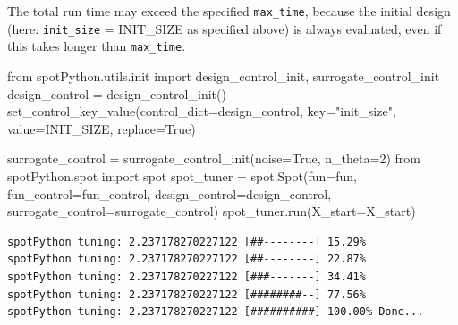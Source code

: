 \documentclass[
  letterpaper,
  DIV=11,
  numbers=noendperiod]{scrreprt}
\newenvironment{Shaded}{\begin{snugshade}}{\end{snugshade}}
\newcommand{\DecValTok}[1]{\textcolor[rgb]{0.68,0.00,0.00}{#1}}
\newcommand{\ImportTok}[1]{\textcolor[rgb]{0.00,0.46,0.62}{#1}}
\newcommand{\NormalTok}[1]{\textcolor[rgb]{0.00,0.23,0.31}{#1}}
\newcommand{\OperatorTok}[1]{\textcolor[rgb]{0.37,0.37,0.37}{#1}}
\newcommand{\StringTok}[1]{\textcolor[rgb]{0.13,0.47,0.30}{#1}}
\newcommand{\VariableTok}[1]{\textcolor[rgb]{0.07,0.07,0.07}{#1}}
\begin{document}
\begin{tcolorbox}[enhanced jigsaw, coltitle=black, bottomrule=.15mm, breakable, toprule=.15mm, colframe=quarto-callout-note-color-frame, title=\textcolor{quarto-callout-note-color}{\faInfo}\hspace{0.5em}{Note: Total run time}, colbacktitle=quarto-callout-note-color!10!white, opacityback=0, left=2mm, leftrule=.75mm, colback=white, rightrule=.15mm, bottomtitle=1mm, toptitle=1mm, titlerule=0mm, arc=.35mm, opacitybacktitle=0.6]

The total run time may exceed the specified \texttt{max\_time}, because
the initial design (here: \texttt{init\_size} = INIT\_SIZE as specified
above) is always evaluated, even if this takes longer than
\texttt{max\_time}.

\end{tcolorbox}

\begin{Shaded}
\begin{Highlighting}[]
\ImportTok{from}\NormalTok{ spotPython.utils.init }\ImportTok{import}\NormalTok{ design\_control\_init, surrogate\_control\_init}
\NormalTok{design\_control }\OperatorTok{=}\NormalTok{ design\_control\_init()}
\NormalTok{set\_control\_key\_value(control\_dict}\OperatorTok{=}\NormalTok{design\_control,}
\NormalTok{                        key}\OperatorTok{=}\StringTok{"init\_size"}\NormalTok{,}
\NormalTok{                        value}\OperatorTok{=}\NormalTok{INIT\_SIZE,}
\NormalTok{                        replace}\OperatorTok{=}\VariableTok{True}\NormalTok{)}

\NormalTok{surrogate\_control }\OperatorTok{=}\NormalTok{ surrogate\_control\_init(noise}\OperatorTok{=}\VariableTok{True}\NormalTok{,}
\NormalTok{                                           n\_theta}\OperatorTok{=}\DecValTok{2}\NormalTok{)}
\ImportTok{from}\NormalTok{ spotPython.spot }\ImportTok{import}\NormalTok{ spot}
\NormalTok{spot\_tuner }\OperatorTok{=}\NormalTok{ spot.Spot(fun}\OperatorTok{=}\NormalTok{fun,}
\NormalTok{                   fun\_control}\OperatorTok{=}\NormalTok{fun\_control,}
\NormalTok{                   design\_control}\OperatorTok{=}\NormalTok{design\_control,}
\NormalTok{                   surrogate\_control}\OperatorTok{=}\NormalTok{surrogate\_control)}
\NormalTok{spot\_tuner.run(X\_start}\OperatorTok{=}\NormalTok{X\_start)}
\end{Highlighting}
\end{Shaded}

\begin{verbatim}
spotPython tuning: 2.237178270227122 [##--------] 15.29% 
spotPython tuning: 2.237178270227122 [##--------] 22.87% 
spotPython tuning: 2.237178270227122 [###-------] 34.41% 
spotPython tuning: 2.237178270227122 [########--] 77.56% 
spotPython tuning: 2.237178270227122 [##########] 100.00% Done...
\end{verbatim}
\end{document}
